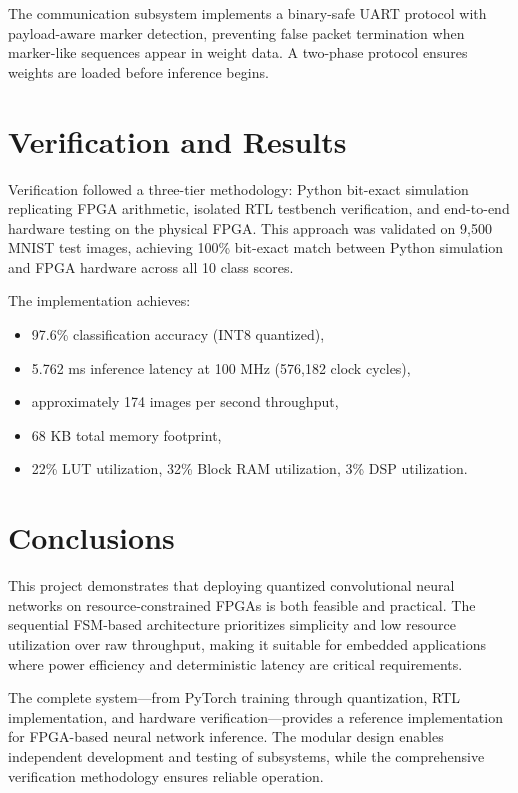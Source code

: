 \documentclass[12pt,a4paper]{report}
\begin{document}
The communication subsystem implements a binary-safe UART protocol with payload-aware marker detection, preventing false packet termination when marker-like sequences appear in weight data. A two-phase protocol ensures weights are loaded before inference begins.

\section{Verification and Results}

Verification followed a three-tier methodology: Python bit-exact simulation replicating FPGA arithmetic, isolated RTL testbench verification, and end-to-end hardware testing on the physical FPGA. This approach was validated on 9,500 MNIST test images, achieving 100\% bit-exact match between Python simulation and FPGA hardware across all 10 class scores.

The implementation achieves:
\begin{itemize}
    \item 97.6\% classification accuracy (INT8 quantized),
    \item 5.762 ms inference latency at 100 MHz (576,182 clock cycles),
    \item approximately 174 images per second throughput,
    \item 68 KB total memory footprint,
    \item 22\% LUT utilization, 32\% Block RAM utilization, 3\% DSP utilization.
\end{itemize}

\section{Conclusions}

This project demonstrates that deploying quantized convolutional neural networks on resource-constrained FPGAs is both feasible and practical. The sequential FSM-based architecture prioritizes simplicity and low resource utilization over raw throughput, making it suitable for embedded applications where power efficiency and deterministic latency are critical requirements.

The complete system—from PyTorch training through quantization, RTL implementation, and hardware verification—provides a reference implementation for FPGA-based neural network inference. The modular design enables independent development and testing of subsystems, while the comprehensive verification methodology ensures reliable operation.
\end{document}
